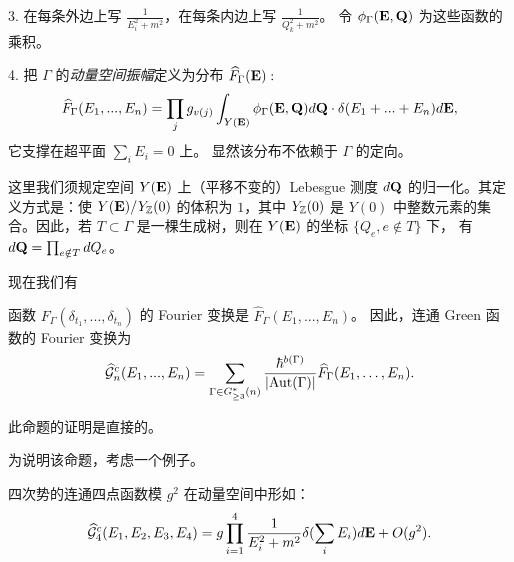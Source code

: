 3. 在每条外边上写 $\frac{1}{E_i^2+m^2}$，在每条内边上写 $\frac{1}{Q_k^2+m^2}$。
令 $\phi_\Gamma(\bold E,\bold Q)$ 为这些函数的乘积。

4. 把 $\Gamma$ 的\emph{动量空间振幅}定义为分布 $\widehat F_\Gamma(\bold E):$
$$
\widehat F_\Gamma(E_1,...,E_n)=
\prod_jg_{v(j)}
\int_{Y(\bold E)}\phi_\Gamma(\bold E,\bold Q)d\bold Q\cdot \delta(E_1+...+E_n)d\bold E,
$$
它支撑在超平面 $\sum_i E_i=0$ 上。
显然该分布不依赖于 $\Gamma$ 的定向。

\begin{remark} 这里我们须规定空间 $Y(\bold E)$ 上（平移不变的）Lebesgue 测度  $d\bold Q$ 
的归一化。其定义方式是：使 $Y(\bold E)/Y_{\Bbb Z}(0)$ 的体积为 $1$，其中 $Y_{\Bbb  Z}(0)$ 是 $Y(0)$ 中整数元素的集合。因此，若 $T\subset \Gamma$ 是一棵生成树，则在 $Y(\bold E)$ 的坐标 $\lbrace Q_e,e\notin T\rbrace$ 下，
有 $d\bold Q=\prod_{e\notin T}dQ_e$。
 \end{remark} 


现在我们有

\begin{proposition}
函数 $F_\Gamma(\delta_{t_1},...,\delta_{t_n})$ 的 Fourier 变换是
$\widehat F_\Gamma(E_1,...,E_n)$。
因此，连通 Green 函数的 Fourier 变换为
\begin{equation}\label{defcor1}
\widehat\G_n^c(E_1,...,E_n)=
\sum_{\Gamma\in G_{\ge 3}^*(n)}\frac{\hbar^{b(\Gamma)}}{|{\rm Aut}(\Gamma)|}
\widehat F_\Gamma(E_1, \ldots, E_n).
\end{equation}
\end{proposition}

此命题的证明是直接的。

为说明该命题，考虑一个例子。

\begin{example}
四次势的连通四点函数模 $g^2$ 在动量空间中形如：
$$
\widehat \G_4^c(E_1,E_2,E_3,E_4)=
g\prod_{i=1}^4\frac{1}{E_i^2+m^2}\delta(\sum_i E_i)d\bold E+O(g^2).
$$
\end{example}

